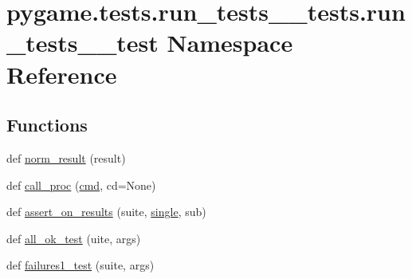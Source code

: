 \hypertarget{namespacepygame_1_1tests_1_1run__tests____tests_1_1run__tests____test}{}\section{pygame.\+tests.\+run\+\_\+tests\+\_\+\+\_\+tests.\+run\+\_\+tests\+\_\+\+\_\+test Namespace Reference}
\label{namespacepygame_1_1tests_1_1run__tests____tests_1_1run__tests____test}
\subsection*{Functions}
\begin{DoxyCompactItemize}
\item 
def \hyperlink{namespacepygame_1_1tests_1_1run__tests____tests_1_1run__tests____test_a059e9a0898e40d22237bc8c51622d690}{norm\+\_\+result} (result)
\item 
def \hyperlink{namespacepygame_1_1tests_1_1run__tests____tests_1_1run__tests____test_ad1f40285def0d59ba6f9cd875d89cf12}{call\+\_\+proc} (\hyperlink{namespacepygame_1_1tests_1_1run__tests____tests_1_1run__tests____test_aa5c921e975dfdd579f2a63bee20bbdcd}{cmd}, cd=None)
\item 
def \hyperlink{namespacepygame_1_1tests_1_1run__tests____tests_1_1run__tests____test_afdd6b3ef0e3a9572bf0864ce72a162fd}{assert\+\_\+on\+\_\+results} (suite, \hyperlink{namespacepygame_1_1tests_1_1run__tests____tests_1_1run__tests____test_aba3fbee6736c59b7b4c68e124a17e9dc}{single}, sub)
\item 
def \hyperlink{namespacepygame_1_1tests_1_1run__tests____tests_1_1run__tests____test_afd58757da8048b03ce7fd43c01814309}{all\+\_\+ok\+\_\+test} (uite, args)
\item 
def \hyperlink{namespacepygame_1_1tests_1_1run__tests____tests_1_1run__tests____test_abc45e270c2444b8d6866429ec09074cb}{failures1\+\_\+test} (suite, args)
\end{DoxyCompactItemize}
